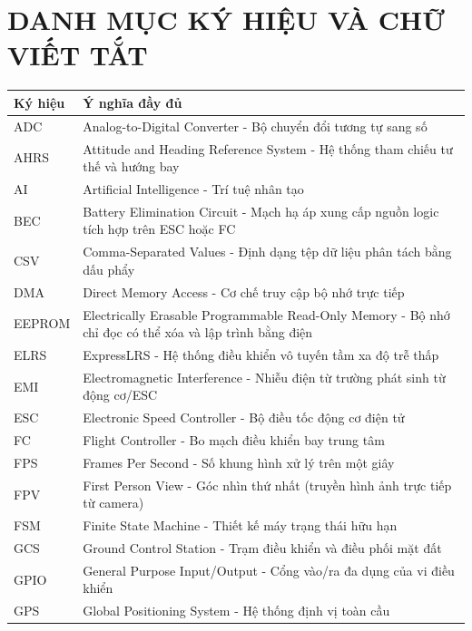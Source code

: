 \section*{DANH MỤC KÝ HIỆU VÀ CHỮ VIẾT TẮT}

\begin{center}
\renewcommand{\arraystretch}{1.4}
\begin{longtable}{|l|p{11.5cm}|}
\hline
\textbf{Ký hiệu} & \textbf{Ý nghĩa đầy đủ} \\ \hline
\endhead
ADC & Analog-to-Digital Converter - Bộ chuyển đổi tương tự sang số \\ \hline
AHRS & Attitude and Heading Reference System - Hệ thống tham chiếu tư thế và hướng bay \\ \hline
AI & Artificial Intelligence - Trí tuệ nhân tạo \\ \hline
BEC & Battery Elimination Circuit - Mạch hạ áp xung cấp nguồn logic tích hợp trên ESC hoặc FC \\ \hline
CSV & Comma-Separated Values - Định dạng tệp dữ liệu phân tách bằng dấu phẩy \\ \hline
DMA & Direct Memory Access - Cơ chế truy cập bộ nhớ trực tiếp \\ \hline
EEPROM & Electrically Erasable Programmable Read-Only Memory - Bộ nhớ chỉ đọc có thể xóa và lập trình bằng điện \\ \hline
ELRS & ExpressLRS - Hệ thống điều khiển vô tuyến tầm xa độ trễ thấp \\ \hline
EMI & Electromagnetic Interference - Nhiễu điện từ trường phát sinh từ động cơ/ESC \\ \hline
ESC & Electronic Speed Controller - Bộ điều tốc động cơ điện tử \\ \hline
FC & Flight Controller - Bo mạch điều khiển bay trung tâm \\ \hline
FPS & Frames Per Second - Số khung hình xử lý trên một giây \\ \hline
FPV & First Person View - Góc nhìn thứ nhất (truyền hình ảnh trực tiếp từ camera) \\ \hline
FSM & Finite State Machine - Thiết kế máy trạng thái hữu hạn \\ \hline
GCS & Ground Control Station - Trạm điều khiển và điều phối mặt đất \\ \hline
GPIO & General Purpose Input/Output - Cổng vào/ra đa dụng của vi điều khiển \\ \hline
GPS & Global Positioning System - Hệ thống định vị toàn cầu \\ \hline

\end{longtable}
\end{center}
